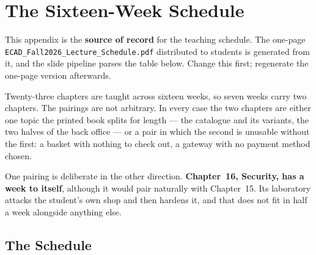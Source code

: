 \chapter{The Sixteen-Week Schedule}\label{app:schedule}
\normalfigures

This appendix is the \textbf{source of record} for the teaching schedule. The
one-page \texttt{ECAD\_Fall2026\_Lecture\_Schedule.pdf} distributed to students
is generated from it, and the slide pipeline parses the table below. Change
this first; regenerate the one-page version afterwards.

Twenty-three chapters are taught across sixteen weeks, so seven weeks carry two
chapters. The pairings are not arbitrary. In every case the two chapters are
either one topic the printed book splits for length --- the catalogue and its
variants, the two halves of the back office --- or a pair in which the second
is unusable without the first: a basket with nothing to check out, a gateway
with no payment method chosen.

One pairing is deliberate in the other direction. \textbf{Chapter~16, Security,
has a week to itself}, although it would pair naturally with Chapter~15. Its
laboratory attacks the student's own shop and then hardens it, and that does
not fit in half a week alongside anything else.

\section{The Schedule}

